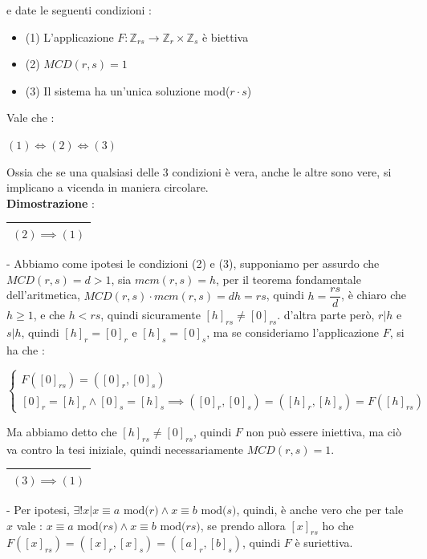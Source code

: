 \documentclass[12pt, letterpaper]{article}
\begin{document}
e date le seguenti condizioni :
\begin{itemize}
    \item (1) L'applicazione \(F:\mathbb{Z}_{rs}\rightarrow \mathbb{Z}_r \times \mathbb{Z}_s \) è biettiva
    \item (2) \(MCD(r,s)=1\)
    \item (3) Il sistema ha un'unica soluzione mod(\(r\cdot s\))
\end{itemize}
Vale che : \begin{center}\((1)\iff(2)\iff(3)\)\end{center}
Ossia che se una qualsiasi delle 3 condizioni è vera, anche le altre sono vere, si implicano a vicenda 
in maniera circolare.
\\ \textbf{Dimostrazione } :\\ \begin{tabular}{|c|}\hline \((2)\implies(1)\) \\ \hline\end{tabular} - 
Abbiamo come ipotesi le condizioni (2) e (3), supponiamo per assurdo che \(MCD(r,s)=d>1\), sia 
\(mcm(r,s)=h\), per il teorema fondamentale dell'aritmetica, \(MCD(r,s)\cdot mcm(r,s) = dh = rs\), 
quindi \(h=\dfrac{rs}{d}\), è chiaro che \(h\ge1\), e che \(h<rs\), quindi sicuramente \([h]_{rs}\ne [0]_{rs}\).
d'altra parte però, \(r|h\) e \(s|h\), quindi \([h]_{r}= [0]_{r}\) e \([h]_{s}= [0]_{s}\), ma se consideriamo 
l'applicazione \(F\),  si ha che : \begin{center}
    \(\begin{cases}
        F([0]_{rs})=([0]_r,[0]_s)\\
        [0]_r = [h]_r \land [0]_s= [h]_s \implies ([0]_r,[0]_s)=([h]_r,[h]_s)=F([h]_{rs})
    \end{cases}\)
\end{center}
Ma abbiamo detto che \([h]_{rs}\ne [0]_{rs}\), quindi \(F\) non può essere iniettiva, ma ciò 
va contro la tesi iniziale, quindi necessariamente \(MCD(r,s)=1\).
\\\begin{tabular}{|c|}\hline \((3)\implies(1)\) \\ \hline\end{tabular} - 
Per ipotesi, \(\exists !x|x\equiv a \text{ mod(}r\text{)}\land x\equiv b \text{ mod(}s\text{)}\), quindi, è anche vero
che per tale \(x\) vale : \(x\equiv a \text{ mod(}rs\text{)}\land x\equiv b \text{ mod(}rs\text{)}\),
se prendo allora \([x]_{rs}\) ho che \(F([x]_{rs})=([x]_r,[x]_s)=([a]_r,[b]_s)\), quindi \(F\) è suriettiva. 
\end{document}

